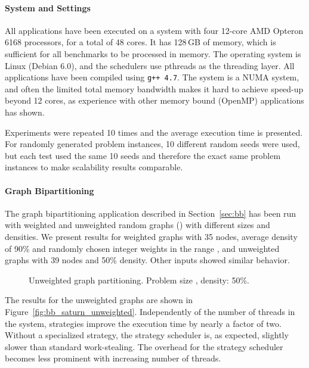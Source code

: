 \documentclass[a4paper,11pt]{article}
\begin{document}
\paragraph{System and Settings}

All applications have been executed on a system with four 12-core AMD
Opteron 6168 processors, for a total of 48 cores. It has 128\,GB of
memory, which is sufficient for all benchmarks to be processed in
memory.  The operating system is Linux (Debian 6.0), and the
schedulers use pthreads as the threading layer. All applications have
been compiled using \texttt{g++ 4.7}. The system is a NUMA system, and
often the limited total memory bandwidth makes it hard to achieve
speed-up beyond 12 cores, as experience with other memory bound
(OpenMP) applications has shown.

Experiments were repeated 10 times and the average execution time is
presented. For randomly generated problem instances, 10 different
random seeds were used, but each test used the same 10 seeds and
therefore the exact same problem instances to make scalability results
comparable.

\paragraph{Graph Bipartitioning}
\label{sec:results_bb}

The graph bipartitioning application described in Section~\ref{sec:bb}
has been run with weighted and unweighted random graphs ()
with different sizes and densities. We present results for weighted
graphs with 35 nodes, average density of 90\% and randomly chosen
integer weights in the range , and unweighted graphs with 39
nodes and 50\% density. Other inputs showed similar behavior.

\begin{figure}
\centering
{}
\caption{Unweighted graph partitioning. Problem size , density: 50\%.}
\end{figure}

The results for the unweighted graphs are shown in
Figure~\ref{fig:bb_saturn_unweighted}.  Independently of the number of
threads in the system, strategies improve the execution time by nearly
a factor of two. Without a specialized strategy, the strategy
scheduler is, as expected, slightly slower than standard
work-stealing.  The overhead for the strategy scheduler becomes less
prominent with increasing number of threads.
\end{document}
